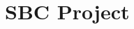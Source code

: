 \chapter{SBC Project}
\hypertarget{index}{}\label{index}
\label{index_md_Application_2SSBL_2README}%
%
